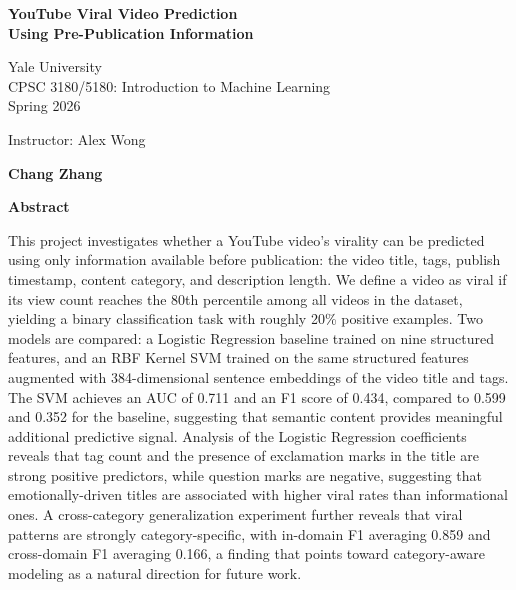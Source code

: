 \documentclass[12pt,a4paper]{article}
\begin{document}
\begin{titlepage}
  \centering
  \vspace*{2cm}
  {\LARGE\bfseries YouTube Viral Video Prediction\\[0.4em]
  Using Pre-Publication Information\par}
  \vspace{1.5cm}
  {\large Yale University\\
  CPSC 3180/5180: Introduction to Machine Learning\\
  Spring 2026\par}
  \vspace{1cm}
  {\large Instructor: Alex Wong\par}
  \vspace{1cm}
  {\large\bfseries Chang Zhang\par}
  \vfill
\end{titlepage}

\begin{center}\large\bfseries Abstract\end{center}
This project investigates whether a YouTube video's virality can be predicted
using only information available before publication: the video title, tags,
publish timestamp, content category, and description length.  We define a video
as viral if its view count reaches the 80th percentile among all videos in the
dataset, yielding a binary classification task with roughly 20\% positive
examples.  Two models are compared: a Logistic Regression baseline trained on
nine structured features, and an RBF Kernel SVM trained on the same structured
features augmented with 384-dimensional sentence embeddings of the video title
and tags.  The SVM achieves an AUC of 0.711 and an F1 score of 0.434, compared
to 0.599 and 0.352 for the baseline, suggesting that semantic content provides
meaningful additional predictive signal.  Analysis of the Logistic Regression
coefficients reveals that tag count and the presence of exclamation marks in
the title are strong positive predictors, while question marks are negative,
suggesting that emotionally-driven titles are associated with higher viral rates
than informational ones.  A
cross-category generalization experiment further reveals that viral patterns are
strongly category-specific, with in-domain F1 averaging 0.859 and cross-domain
F1 averaging 0.166, a finding that points toward category-aware modeling as a
natural direction for future work.
\end{document}

